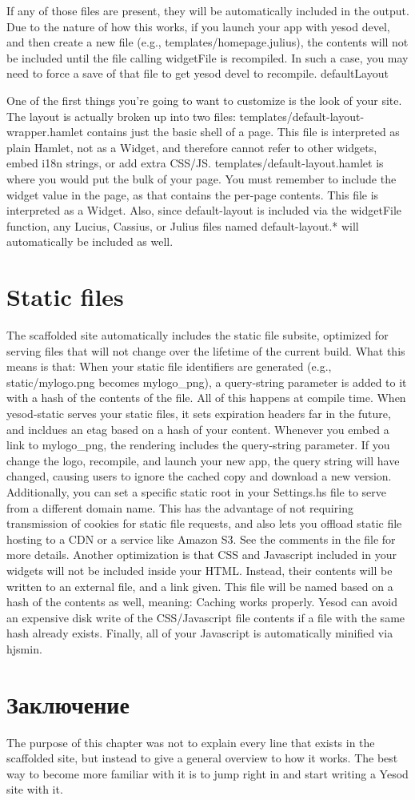 If any of those files are present, they will be automatically included in the output.
Due to the nature of how this works, if you launch your app with yesod devel, and then create a new file (e.g., templates/homepage.julius), the contents will not be included until the file calling widgetFile is recompiled. In such a case, you may need to force a save of that file to get yesod devel to recompile.
defaultLayout

One of the first things you're going to want to customize is the look of your site. The layout is actually broken up into two files:
templates/default-layout-wrapper.hamlet contains just the basic shell of a page. This file is interpreted as plain Hamlet, not as a Widget, and therefore cannot refer to other widgets, embed i18n strings, or add extra CSS/JS.
templates/default-layout.hamlet is where you would put the bulk of your page. You must remember to include the widget value in the page, as that contains the per-page contents. This file is interpreted as a Widget.
Also, since default-layout is included via the widgetFile function, any Lucius, Cassius, or Julius files named default-layout.* will automatically be included as well.
\section{Static files}

The scaffolded site automatically includes the static file subsite, optimized for serving files that will not change over the lifetime of the current build. What this means is that:
When your static file identifiers are generated (e.g., static/mylogo.png becomes mylogo\_png), a query-string parameter is added to it with a hash of the contents of the file. All of this happens at compile time.
When yesod-static serves your static files, it sets expiration headers far in the future, and incldues an etag based on a hash of your content.
Whenever you embed a link to mylogo\_png, the rendering includes the query-string parameter. If you change the logo, recompile, and launch your new app, the query string will have changed, causing users to ignore the cached copy and download a new version.
Additionally, you can set a specific static root in your Settings.hs file to serve from a different domain name. This has the advantage of not requiring transmission of cookies for static file requests, and also lets you offload static file hosting to a CDN or a service like Amazon S3. See the comments in the file for more details.
Another optimization is that CSS and Javascript included in your widgets will not be included inside your HTML. Instead, their contents will be written to an external file, and a link given. This file will be named based on a hash of the contents as well, meaning:
Caching works properly.
Yesod can avoid an expensive disk write of the CSS/Javascript file contents if a file with the same hash already exists.
Finally, all of your Javascript is automatically minified via hjsmin.
\section{Заключение}

The purpose of this chapter was not to explain every line that exists in the scaffolded site, but instead to give a general overview to how it works. The best way to become more familiar with it is to jump right in and start writing a Yesod site with it.


